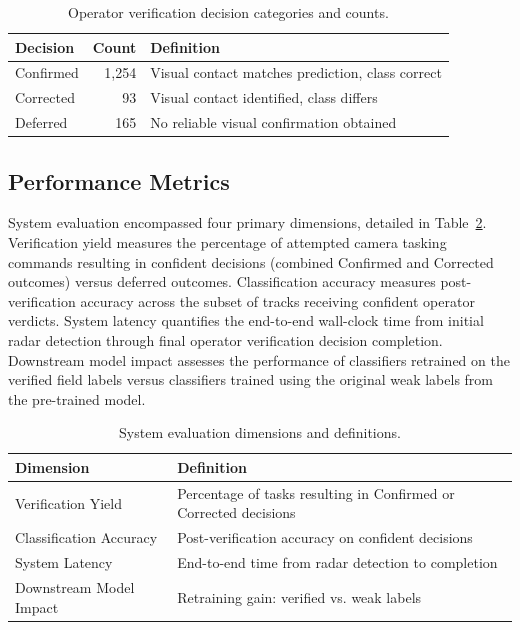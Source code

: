 \documentclass[conf]{asmeconf}
\begin{document}
\begin{table}[t]
\caption{Operator verification decision categories and counts.}
\label{tab:operator_decisions}
\centering
\small
\begin{tabular}{@{}lrp{4cm}@{}}
\toprule
Decision & Count & Definition \\
\midrule
Confirmed & 1,254 & Visual contact matches prediction, class correct \\
\midrule
Corrected & 93 & Visual contact identified, class differs \\
\midrule
Deferred & 165 & No reliable visual confirmation obtained \\
\bottomrule
\end{tabular}
\end{table}

\subsection{Performance Metrics}

System evaluation encompassed four primary dimensions, detailed in Table~\ref{tab:eval_dimensions}. Verification yield measures the percentage of attempted camera tasking commands resulting in confident decisions (combined Confirmed and Corrected outcomes) versus deferred outcomes. Classification accuracy measures post-verification accuracy across the subset of tracks receiving confident operator verdicts. System latency quantifies the end-to-end wall-clock time from initial radar detection through final operator verification decision completion. Downstream model impact assesses the performance of classifiers retrained on the verified field labels versus classifiers trained using the original weak labels from the pre-trained model.

\begin{table}[t]
\caption{System evaluation dimensions and definitions.}
\label{tab:eval_dimensions}
\centering
\small
\begin{tabular}{@{}lp{5cm}@{}}
\toprule
Dimension & Definition \\
\midrule
Verification Yield & Percentage of tasks resulting in Confirmed or Corrected decisions \\
\midrule
Classification Accuracy & Post-verification accuracy on confident decisions \\
\midrule
System Latency & End-to-end time from radar detection to completion \\
\midrule
Downstream Model Impact & Retraining gain: verified vs. weak labels \\
\bottomrule
\end{tabular}
\end{table}
\end{document}
